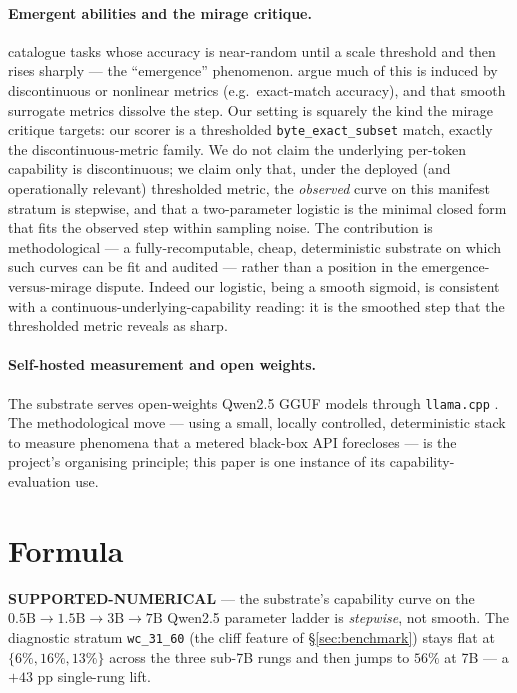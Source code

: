 \documentclass[11pt,a4paper]{article}
\newcommand{\green}[1]{\textcolor{green!50!black}{\textbf{#1}}}
\begin{document}
\paragraph{Emergent abilities and the mirage critique.}
\citet{wei2022emergent} catalogue tasks whose accuracy is near-random until a
scale threshold and then rises sharply --- the ``emergence'' phenomenon.
\citet{schaeffer2023mirage} argue much of this is induced by discontinuous or
nonlinear metrics (e.g.\ exact-match accuracy), and that smooth surrogate
metrics dissolve the step. Our setting is squarely the kind the mirage
critique targets: our scorer is a thresholded \texttt{byte\_exact\_subset}
match, exactly the discontinuous-metric family. We do not claim the
underlying per-token capability is discontinuous; we claim only that, under
the deployed (and operationally relevant) thresholded metric, the
\emph{observed} curve on this manifest stratum is stepwise, and that a
two-parameter logistic is the minimal closed form that fits the observed
step within sampling noise. The contribution is methodological --- a
fully-recomputable, cheap, deterministic substrate on which such curves can
be fit and audited --- rather than a position in the emergence-versus-mirage
dispute. Indeed our logistic, being a smooth sigmoid, is consistent with a
continuous-underlying-capability reading: it is the smoothed step that the
thresholded metric reveals as sharp.

\paragraph{Self-hosted measurement and open weights.} The substrate serves
open-weights Qwen2.5 \citep{qwen2024} GGUF models through
\texttt{llama.cpp} \citep{llamacpp}. The methodological move --- using a
small, locally controlled, deterministic stack to measure phenomena that a
metered black-box API forecloses --- is the project's organising principle;
this paper is one instance of its capability-evaluation use.

\section{Formula}
\label{sec:formula}
\green{SUPPORTED-NUMERICAL} --- the substrate's capability curve on the
\(0.5\text{B} \to 1.5\text{B} \to 3\text{B} \to 7\text{B}\) Qwen2.5
parameter ladder is \emph{stepwise}, not smooth. The diagnostic stratum
\texttt{wc\_31\_60} (the cliff feature of §\ref{sec:benchmark}) stays flat at
\(\{6\%, 16\%, 13\%\}\) across the three sub-7B rungs and then jumps to
\(56\%\) at 7B --- a \(+43\) pp single-rung lift.
\end{document}
